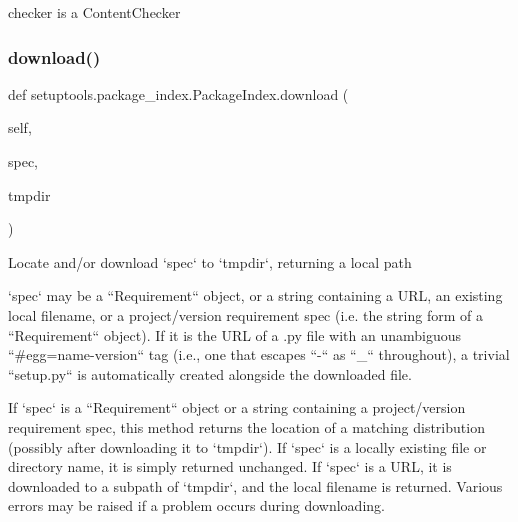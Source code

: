 \begin{DoxyVerb}checker is a ContentChecker
\end{DoxyVerb}
 \mbox{\label{classsetuptools_1_1package__index_1_1_package_index_a100de731e036d1fc5e9604355e02deed}} 
\subsubsection{\texorpdfstring{download()}{download()}}
{\footnotesize\ttfamily def setuptools.\+package\+\_\+index.\+Package\+Index.\+download (\begin{DoxyParamCaption}\item[{}]{self,  }\item[{}]{spec,  }\item[{}]{tmpdir }\end{DoxyParamCaption})}

\begin{DoxyVerb}Locate and/or download `spec` to `tmpdir`, returning a local path

`spec` may be a ``Requirement`` object, or a string containing a URL,
an existing local filename, or a project/version requirement spec
(i.e. the string form of a ``Requirement`` object).  If it is the URL
of a .py file with an unambiguous ``#egg=name-version`` tag (i.e., one
that escapes ``-`` as ``_`` throughout), a trivial ``setup.py`` is
automatically created alongside the downloaded file.

If `spec` is a ``Requirement`` object or a string containing a
project/version requirement spec, this method returns the location of
a matching distribution (possibly after downloading it to `tmpdir`).
If `spec` is a locally existing file or directory name, it is simply
returned unchanged.  If `spec` is a URL, it is downloaded to a subpath
of `tmpdir`, and the local filename is returned.  Various errors may be
raised if a problem occurs during downloading.
\end{DoxyVerb}
 \mbox{\label{classsetuptools_1_1package__index_1_1_package_index_a4fa8a0112703f75c6af17996ce6eb66e}} 

